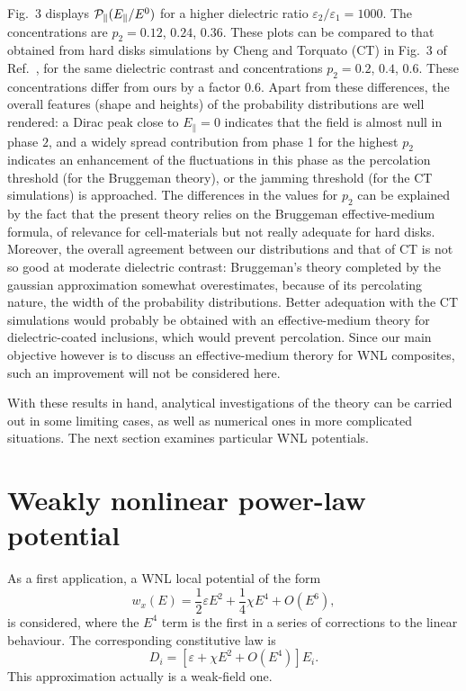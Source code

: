 Fig.\ 3 displays ${\cal P}_\parallel(E_\parallel/E^0)$ for a higher 
dielectric ratio $\varepsilon_2/\varepsilon_1=1000$. 
The concentrations are $p_2=0.12$, $0.24$, $0.36$. These plots 
can be compared to that obtained from hard disks simulations by 
Cheng and Torquato (CT) in Fig.\ 3 of Ref.\ \cite{CHEN97}, for 
the same dielectric contrast and concentrations $p_2=0.2$, $0.4$, 
$0.6$. These concentrations differ from ours by a factor $0.6$. 
Apart from these differences, the overall features (shape and 
heights) of the probability distributions  are well rendered: 
a Dirac peak close to $E_\parallel=0$ indicates that the field 
is almost null in phase $2$, and a widely spread contribution 
from phase 1 for the highest $p_2$ indicates an enhancement 
of the fluctuations in this phase as the percolation 
threshold (for the Bruggeman theory), or the jamming 
threshold (for the CT simulations) is approached. The 
differences in the values for $p_2$ can be explained by 
the fact that the present theory relies on the Bruggeman 
effective-medium formula, of relevance for cell-materials 
but not really adequate for hard disks. Moreover, the 
overall agreement between our distributions and that of 
CT is not so good at moderate dielectric contrast: Bruggeman's 
theory completed by the gaussian approximation somewhat 
overestimates, because of its percolating nature, the width 
of the probability distributions. Better adequation with the 
CT simulations would probably be obtained with an 
effective-medium theory for dielectric-coated inclusions,
 which would prevent percolation. Since our main objective 
however is to discuss an effective-medium therory for WNL 
composites, such an improvement will not be considered here. 


With these results in hand, analytical investigations of the 
theory can be carried out in some limiting cases, as well as 
numerical ones in more complicated situations. The next 
section examines particular WNL potentials.

\section{Weakly nonlinear power-law potential}
\label{wnpp}
As a first application, a WNL local potential of the form 
\begin{equation}
w_x(E)=\frac{1}{2}\varepsilon E^2+\frac{1}{4}\chi E^4+O(E^6), 
\end{equation}
is considered, where the $E^4$ term is the first in a series of corrections 
to the linear behaviour. The corresponding constitutive law is
\begin{equation}
D_i=[\varepsilon+\chi E^2+O(E^4)] E_i. 
\end{equation}
This approximation actually is a weak-field one.

